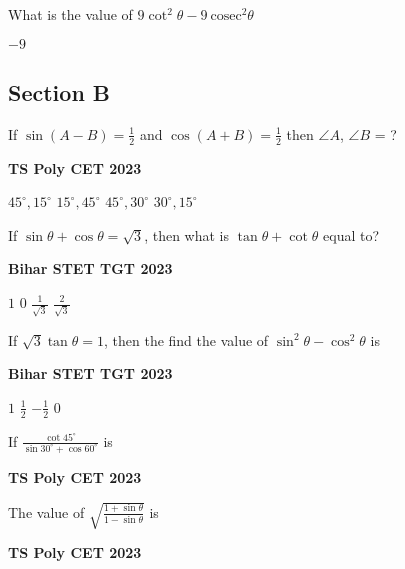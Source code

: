 \documentclass[11pt,paper=a4,answers]{exam}
\begin{document}
\begin{multicols}{2}
\begin{questions}
\begin{choices}
\end{choices}
\question What is the value of $9 \cot^2 \theta -9\ \textrm{cosec}^2 \theta$


\begin{choices}
\choice $-9$
\end{choices}
\subsection*{Section B}
\question If $\displaystyle \sin \left(A-B \right) = \frac{1}{2}$ and $\displaystyle \cos \left( A+B \right) = \frac{1}{2}$ then $\angle A$, $\angle B$ = ?

\begin{flushright}
\small\textbf{TS Poly CET 2023}
\end{flushright}


\begin{choices}
\choice $\displaystyle 45^{\circ}, 15^{\circ}$ 
\choice $\displaystyle 15^{\circ}, 45^{\circ}$ 
\choice $\displaystyle 45^{\circ}, 30^{\circ}$ 
\choice $\displaystyle 30^{\circ}, 15^{\circ}$ 
\end{choices}

\columnbreak
\question If $\sin \theta + \cos \theta = \sqrt{3}$, then what is  $\tan \theta + \cot \theta$ equal to?
\begin{flushright}
\small\textbf{Bihar STET TGT 2023}
\end{flushright}


\begin{choices}
\choice $\displaystyle 1$ 
\choice $\displaystyle 0$  
\choice $\displaystyle \frac{1}{\sqrt{3}}$  
\choice $\displaystyle \frac{2}{\sqrt{3}}$  
\end{choices}


\question If $\sqrt{3} \tan  \theta = 1$, then the find the value of $\sin^2 \theta  - \cos^2 \theta$ is
\begin{flushright}
\small\textbf{Bihar STET TGT 2023}
\end{flushright}


\begin{choices}
\choice $\displaystyle 1$ 
\choice $\displaystyle \frac{1}{2}$ 
\choice $\displaystyle - \frac{1}{2}$ 
\choice $\displaystyle 0$ 
\end{choices}

\question 
If $\displaystyle \frac{ \cot 45^{\circ} }{\sin 30^{\circ} + \cos 60^{\circ} } $ is
\begin{flushright}
\small\textbf{TS Poly CET 2023}
\end{flushright}
\begin{choices}
\end{choices}
\question The value of $\displaystyle \sqrt{\frac{1+ \sin \theta}{1-\sin \theta}}   $ is
\begin{flushright}
\small\textbf{TS Poly CET 2023}
\end{flushright}



\end{questions}
\end{multicols}
\end{document}

